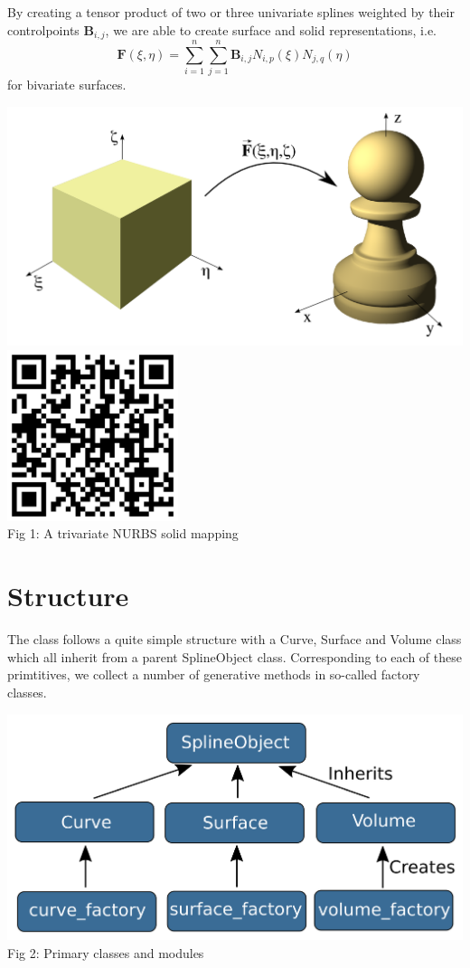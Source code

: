 \documentclass[landscape]{sintefposter}
\begin{document}
\begin{multicols}{3}
By creating a tensor product of two or three univariate splines weighted by their controlpoints $\mathbf{B}_{i,j}$, we are able to create surface and solid representations, i.e.
\begin{equation}
  \mathbf{F}(\xi,\eta) = \sum_{i=1}^n \sum_{j=1}^n \mathbf{B}_{i,j} N_{i,p}(\xi)N_{j,q}(\eta)
\end{equation}
for bivariate surfaces.

\begin{center}
  \includegraphics[width=16cm]{pawn-mapping}
  \includegraphics[height=5cm]{MappingQR} \\
  \normalsize{Fig 1: A trivariate NURBS solid mapping}
\end{center}

\section{Structure}

The class follows a quite simple structure with a Curve, Surface and Volume class which all inherit from a parent SplineObject class. Corresponding to each of these primtitives, we collect a number of generative methods in so-called factory classes.

\begin{center}
  \includegraphics[width=0.7\linewidth]{classstructure} \\
  \normalsize{Fig 2: Primary classes and modules}
\end{center}


\end{multicols}
\end{document}
